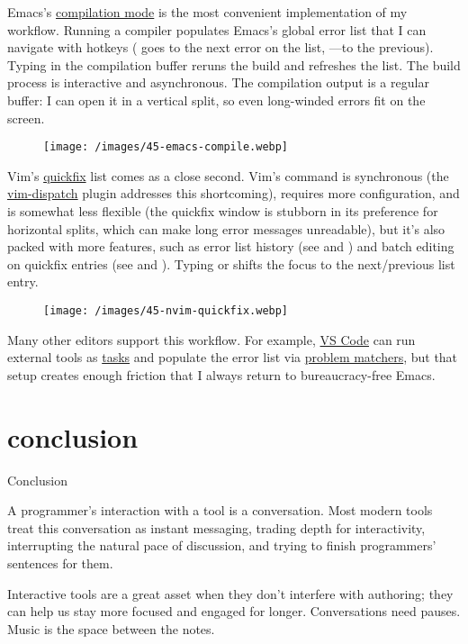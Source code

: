\documentclass{article}
\begin{document}
Emacs's \href{https://www.gnu.org/software/emacs/manual/html_node/emacs/Compilation.html}{compilation mode} is the most convenient implementation of my workflow.
Running a compiler populates Emacs's global error list that I can navigate with hotkeys
( goes to the next error on the list, ---to the previous).
Typing  in the compilation buffer reruns the build and refreshes the list.
The build process is interactive and asynchronous.
The compilation output is a regular buffer:
I can open it in a vertical split, so even long-winded errors fit on the screen.

\begin{figure}
  \texttt{[image: /images/45-emacs-compile.webp]}
\end{figure}

Vim's \href{https://neovim.io/doc/user/quickfix.html}{quickfix} list comes as a close second.
Vim's  command is synchronous
(the \href{https://github.com/tpope/vim-dispatch}{vim-dispatch} plugin addresses this shortcoming),
requires more configuration,
and is somewhat less flexible
(the quickfix window is stubborn in its preference for horizontal splits, which can make long error messages unreadable),
but it's also packed with more features,
such as error list history (see  and )
and batch editing on quickfix entries (see  and ).
Typing \code{]q} or \code{[q} shifts the focus to the next/previous list entry.

\begin{figure}
  \texttt{[image: /images/45-nvim-quickfix.webp]}
\end{figure}

Many other editors support this workflow.
For example, \href{https://code.visualstudio.com/}{VS Code} can run external tools
as \href{https://code.visualstudio.com/docs/debugtest/tasks}{tasks}
and populate the error list via \href{https://code.visualstudio.com/docs/debugtest/tasks#_defining-a-problem-matcher}{problem matchers},
but that setup creates enough friction that I always return to bureaucracy-free Emacs.

\section{conclusion}{Conclusion}

A programmer's interaction with a tool is a conversation.
Most modern tools treat this conversation as instant messaging,
trading depth for interactivity,
interrupting the natural pace of discussion,
and trying to finish programmers' sentences for them.

Interactive tools are a great asset when they don't interfere with authoring;
they can help us stay more focused and engaged for longer.
Conversations need pauses. Music is the space between the notes.
\end{document}
